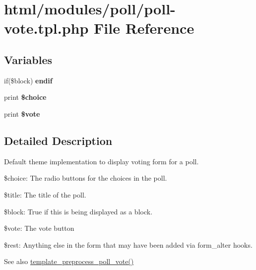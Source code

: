 \hypertarget{poll-vote_8tpl_8php}{
\section{html/modules/poll/poll-\/vote.tpl.php File Reference}
\label{poll-vote_8tpl_8php}
}
\subsection*{Variables}
\begin{DoxyCompactItemize}
\item 
\hypertarget{poll-vote_8tpl_8php_a2a3e15bb5e0945e9a2f02cb9255d85b1}{
if(\$block) {\bfseries endif}}
\label{poll-vote_8tpl_8php_a2a3e15bb5e0945e9a2f02cb9255d85b1}

\item 
\hypertarget{poll-vote_8tpl_8php_aa3f0cb9a60ba47d1b0d8040476207796}{
print {\bfseries \$choice}}
\label{poll-vote_8tpl_8php_aa3f0cb9a60ba47d1b0d8040476207796}

\item 
\hypertarget{poll-vote_8tpl_8php_a827c3e4a1b17dbe0a4760d53352bcba0}{
print {\bfseries \$vote}}
\label{poll-vote_8tpl_8php_a827c3e4a1b17dbe0a4760d53352bcba0}

\end{DoxyCompactItemize}


\subsection{Detailed Description}
Default theme implementation to display voting form for a poll.


\begin{DoxyItemize}
\item \$choice: The radio buttons for the choices in the poll.
\item \$title: The title of the poll.
\item \$block: True if this is being displayed as a block.
\item \$vote: The vote button
\item \$rest: Anything else in the form that may have been added via form\_\-alter hooks.
\end{DoxyItemize}

\begin{DoxySeeAlso}{See also}
\hyperlink{poll_8module_a480046f67169f2b0d86b0b6c3cb506da}{template\_\-preprocess\_\-poll\_\-vote()} 
\end{DoxySeeAlso}
